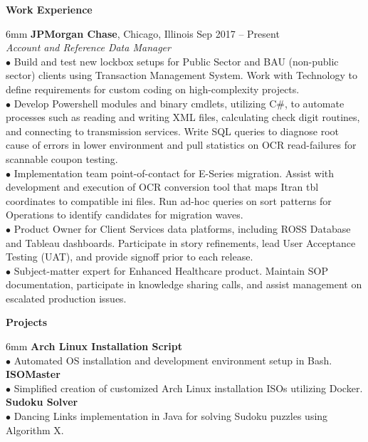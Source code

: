\documentclass[11pt]{article}
\newcommand{\sectionheader}[1]{\noindent \textbf{\large #1}}
\newenvironment{sectionbody}{\begin{adjustwidth}{6mm}{}}{\end{adjustwidth}}
\begin{document}
\sectionheader{Work Experience}
\begin{sectionbody}
{\bf JPMorgan Chase}, Chicago, Illinois \hfill Sep 2017 -- Present \\
\textit{Account and Reference Data Manager} \\
$\bullet$ Build and test new lockbox setups for Public Sector and BAU (non-public sector) clients using Transaction Management System. Work with Technology to define requirements for custom coding on high-complexity projects. \\
$\bullet$ Develop Powershell modules and binary cmdlets, utilizing C\#, to automate processes such as reading and writing XML files, calculating check digit routines, and connecting to transmission services. Write SQL queries to diagnose root cause of errors in lower environment and pull statistics on OCR read-failures for scannable coupon testing. \\
$\bullet$ Implementation team point-of-contact for E-Series migration. Assist with development and execution of OCR conversion tool that maps Itran tbl coordinates to compatible ini files. Run ad-hoc queries on sort patterns for Operations to identify candidates for migration waves. \\
$\bullet$ Product Owner for Client Services data platforms, including ROSS Database and Tableau dashboards. Participate in story refinements, lead User Acceptance Testing (UAT), and provide signoff prior to each release. \\
$\bullet$ Subject-matter expert for Enhanced Healthcare product. Maintain SOP documentation, participate in knowledge sharing calls, and assist management on escalated production issues. \\
\end{sectionbody}

\vspace{1mm}

\sectionheader{Projects}
\begin{sectionbody}
{\bf Arch Linux Installation Script} \\
$\bullet$ Automated OS installation and development environment setup in Bash. \\
{\bf ISOMaster} \\
$\bullet$ Simplified creation of customized Arch Linux installation ISOs utilizing Docker. \\
{\bf Sudoku Solver} \\
$\bullet$ Dancing Links implementation in Java for solving Sudoku puzzles using Algorithm X.
\end{sectionbody}
\end{document}
